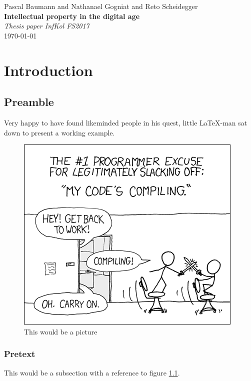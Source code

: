 \documentclass[a4paper]{report}
\newcommand*{\titleAP}{\begingroup %
	\centering
	\vspace*{\baselineskip} %
	
	{\Large Pascal Baumann} and {\Large Nathanael Gogniat} and {\Large Reto Scheidegger}\\[0.167\textheight] %
	
	{\Huge\bfseries Intellectual property in the digital age}\\[\baselineskip]
	
	{\Large \textit{Thesis paper InfKol FS2017}}\\
	\today
	
	\vspace*{3\baselineskip} %
	\endgroup}
\begin{document}
\titleAP

\newpage

\tableofcontents

\newpage

\chapter{Introduction}

\section{Preamble}
Very happy to have found likeminded people in his quest, little \LaTeX-man sat down to present a working example. \parencite{Baumann2017}

\begin{figure}[htb]
	\centering
	\includegraphics[keepaspectratio=true,height=8\baselineskip]{compiling.png}
	\caption{This would be a picture}
	\label{fig:xkcd_compiling}
\end{figure}

\subsection{Pretext}
This would be a subsection with a reference to figure \ref{fig:xkcd_compiling}.

\newpage

\printbibliography
\end{document}
